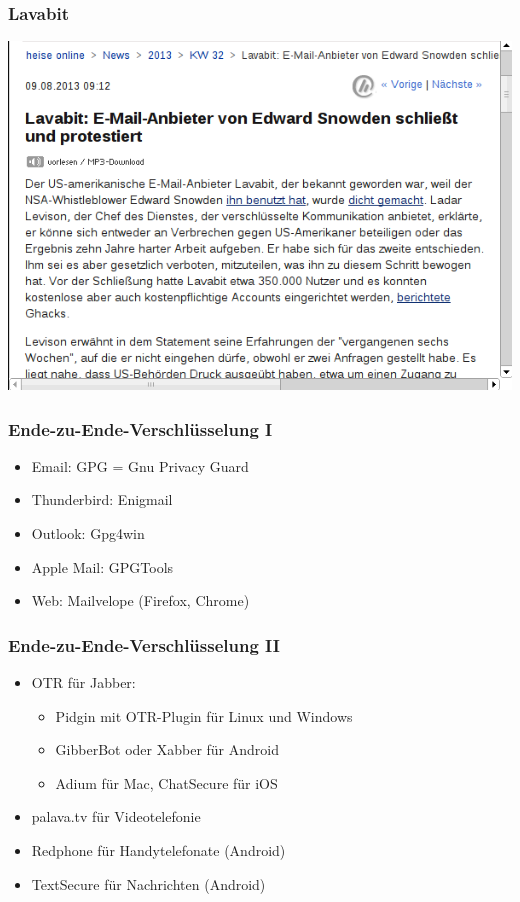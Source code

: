 \documentclass[12pt]{beamer}
\begin{document}
\begin{frame}
    \frametitle{Lavabit}
    \includegraphics[height=0.6\textheight]{img/heise_lavabit.png}
\end{frame}

\begin{frame}
    \frametitle{Ende-zu-Ende-Verschlüsselung I}
    \begin{itemize}\Large
      \item Email: GPG = Gnu Privacy Guard
      \item Thunderbird: Enigmail
      \item Outlook: Gpg4win
      \item Apple Mail: GPGTools
      \item Web: Mailvelope (Firefox, Chrome)
    \end{itemize}
\end{frame}

\begin{frame}
  \frametitle{Ende-zu-Ende-Verschlüsselung II}
  \begin{itemize}
    \item<2-> OTR für Jabber:
      \begin{itemize}
        \item Pidgin mit OTR-Plugin für Linux und Windows
        \item GibberBot oder Xabber für Android
        \item Adium für Mac, ChatSecure für iOS
      \end{itemize}
    \item<3-> palava.tv für Videotelefonie
    \item<4-> Redphone für Handytelefonate (Android)
    \item<5-> TextSecure für Nachrichten (Android)
  \end{itemize}
\end{frame}
\end{document}
